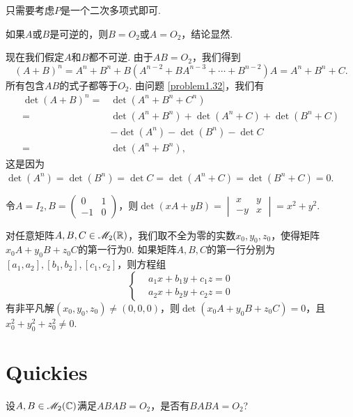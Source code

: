 \begin{solution}
  只需要考虑$P$是一个二次多项式即可.
\end{solution}

\setcounter{solution}{74}

\begin{solution}
  如果$A$或$B$是可逆的，则$B=O_2$或$A=O_2$，结论显然.

  现在我们假定$A$和$B$都不可逆. 由于$AB=O_2$，我们得到
  \[
    (A + B)^n = A^n + B^n + B(A^{n-2} + BA^{n-3} + \cdots + B^{n-2})A = A^n + B^n + C.
  \]
  所有包含$AB$的式子都等于$O_2$. 由问题 \ref{problem1.32}，我们有
  \begin{align*}
    \det (A + B)^n = {}& \det (A^n + B^n + C^n) \\
    = {}& \det (A^n + B^n) + \det (A^n + C) + \det (B^n + C) \\
    & - \det (A^n) - \det (B^n) - \det C \\
    = {}& \det(A^n + B^n),
  \end{align*}
  这是因为$\det(A^n)=\det(B^n)=\det C=\det(A^n+C)
  =\det(B^n+C)=0$.
\end{solution}

\begin{solution}
  \begin{inparaenum}[(a)]
    \item 令$A=I_2,B=\begin{pmatrix}
      0 & 1 \\
      -1 & 0
    \end{pmatrix}$，则$\det(xA+yB)=\begin{vmatrix}
      x & y \\
      -y & x
    \end{vmatrix}=x^2+y^2$.

    \item 对任意矩阵$A,B,C\in\mathscr M_2(\mathbb R)$，我们取不全为零的实数$x_0,y_0,z_0$，使得矩阵$x_0A+y_0B+z_0C$的第一行为0. 如果矩阵$A,B,C$的第一行分别为$[a_1,a_2],[b_1,b_2],[c_1,c_2]$，则方程组
    \[
      \left\{
        \begin{aligned}
          & a_1x + b_1y + c_1z = 0\\
          & a_2x + b_2y + c_2z = 0
        \end{aligned}
      \right.
    \]
    有非平凡解$(x_0,y_0,z_0)\ne(0,0,0)$，则$\det(x_0A+y_0B+z_0C)=0$，且
  $x_0^2+y_0^2+z_0^2\ne0$.
  \end{inparaenum}
\end{solution}

\section{Quickies}
\begin{problem}
  设$A,B\in\mathscr M_2(\mathbb C)$满足$ABAB=O_2$，是否有$BABA=O_2$?
\end{problem}

